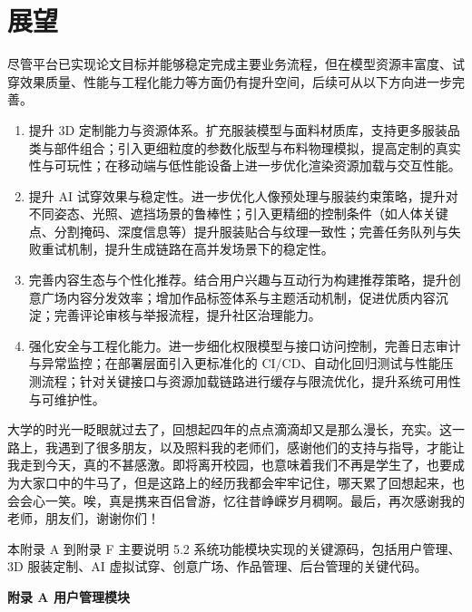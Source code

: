 \documentclass[twoside]{thesis-cls-Miya} %
\begin{document}
\section{展望}

尽管平台已实现论文目标并能够稳定完成主要业务流程，但在模型资源丰富度、试穿效果质量、性能与工程化能力等方面仍有提升空间，后续可从以下方向进一步完善。
\begin{enumerate}[label=(\arabic*)]
	\item 提升 3D 定制能力与资源体系。扩充服装模型与面料材质库，支持更多服装品类与部件组合；引入更细粒度的参数化版型与布料物理模拟，提高定制的真实性与可玩性；在移动端与低性能设备上进一步优化渲染资源加载与交互性能。
	\item 提升 AI 试穿效果与稳定性。进一步优化人像预处理与服装约束策略，提升对不同姿态、光照、遮挡场景的鲁棒性；引入更精细的控制条件（如人体关键点、分割掩码、深度信息等）提升服装贴合与纹理一致性；完善任务队列与失败重试机制，提升生成链路在高并发场景下的稳定性。
	\item 完善内容生态与个性化推荐。结合用户兴趣与互动行为构建推荐策略，提升创意广场内容分发效率；增加作品标签体系与主题活动机制，促进优质内容沉淀；完善评论审核与举报流程，提升社区治理能力。
	\item 强化安全与工程化能力。进一步细化权限模型与接口访问控制，完善日志审计与异常监控；在部署层面引入更标准化的 CI/CD、自动化回归测试与性能压测流程；针对关键接口与资源加载链路进行缓存与限流优化，提升系统可用性与可维护性。
\end{enumerate}




大学的时光一眨眼就过去了，回想起四年的点点滴滴却又是那么漫长，充实。这一路上，我遇到了很多朋友，以及照料我的老师们，感谢他们的支持与指导，才能让我走到今天，真的不甚感激。即将离开校园，也意味着我们不再是学生了，也要成为大家口中的牛马了，但是这路上的经历我都会牢牢记住，哪天累了回想起来，也会会心一笑。唉，真是携来百侣曾游，忆往昔峥嵘岁月稠啊。最后，再次感谢我的老师，朋友们，谢谢你们！


本附录 A 到附录 F 主要说明 5.2 系统功能模块实现的关键源码，包括用户管理、3D 服装定制、AI 虚拟试穿、创意广场、作品管理、后台管理的关键代码。

\clearpage
\noindent\textbf{附录 A \quad 用户管理模块}
\end{document}
